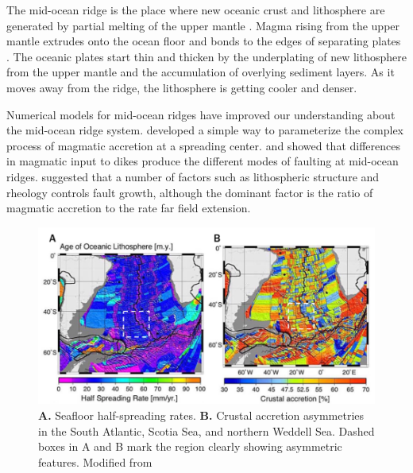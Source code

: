 \documentclass[letterpaper,12pt,notitle]{memphisthesis}                     %
\begin{document}
The mid-ocean ridge is the place where new oceanic crust and lithosphere are generated by partial melting of the upper mantle \citep{Cann1968}. Magma rising from the upper mantle extrudes onto the ocean floor and bonds to the edges of separating plates \citep{Chen1992}. The oceanic plates start thin and thicken by the underplating of new lithosphere from the upper mantle and the accumulation of overlying sediment layers. As it moves away from the ridge, the lithosphere is getting cooler and denser.

  

Numerical models for mid-ocean ridges have improved our understanding about the mid-ocean ridge system. 
\citet{Buck1998} developed a simple way to parameterize the complex process of magmatic accretion at a spreading center. \citet{Buck2005} and \citet{Tucholke2008} showed that differences in magmatic input to dikes produce the different modes of faulting at mid-ocean ridges. \citet{Behn2008} suggested that a number of factors such as lithospheric structure and rheology controls fault growth, although the dominant factor is the ratio of magmatic accretion to the rate far field extension.

\begin{figure}[!htb]
	\centering
	\includegraphics[width=0.9\linewidth]{./figs/hsr_muller.png}
	\caption{\textbf{A.} Seafloor half-spreading rates. \textbf{B.} Crustal accretion asymmetries in the South Atlantic, Scotia Sea, and northern Weddell Sea. Dashed boxes in A and B mark the region clearly showing asymmetric features. Modified from \citet{Muller2008}}
	\label{fig:hsr_muller}
\end{figure}
\end{document}
